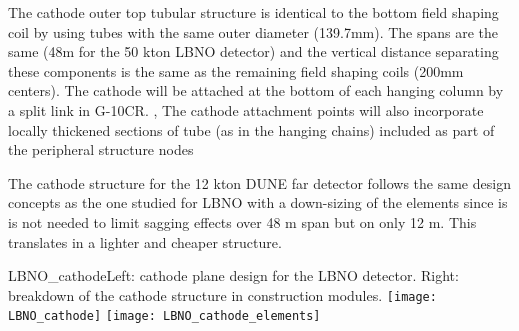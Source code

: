 The cathode outer top tubular structure is identical to the bottom field shaping coil  by using tubes with  the same outer diameter (139.7mm).  The spans are the same (48m for the 50 kton LBNO detector) and the vertical distance separating these components is the same as the remaining field shaping coils (200mm centers). The cathode will be attached at the bottom of each hanging column by a split link in G-10CR. , The cathode attachment points will also incorporate locally thickened sections of tube (as in the hanging chains) included as part of the peripheral structure nodes


The cathode structure for the 12 kton DUNE far detector follows the same design concepts as the one studied for LBNO with a down-sizing of the elements since is is not needed to limit sagging effects over 48 m span but on only 12 m. This translates in a lighter and cheaper structure. 

\begin{cdrfigure}{LBNO_cathode}{\small Left: cathode plane design for the LBNO detector. Right: breakdown of the cathode structure in construction modules.}
\texttt{[image: LBNO\_cathode]} \hfil
\texttt{[image: LBNO\_cathode\_elements]}
\end{cdrfigure}


